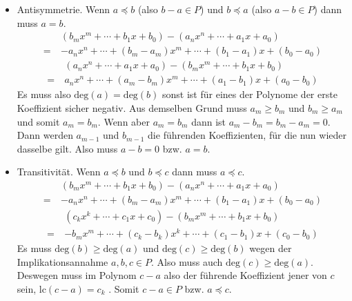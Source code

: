 \documentclass{article}
\begin{document}
\begin{enumerate}
\begin{itemize}
        \item Antisymmetrie. Wenn $a \preccurlyeq b$ (also $b - a \in P$) und $b \preccurlyeq a$ (also $a - b \in P$) dann muss $a = b$.
        \begin{align*}
            &(b_mx^m + \cdots + b_1x + b_0) - (a_nx^n + \cdots + a_1x + a_0) \\
            =\ &-a_nx^n + \cdots + (b_m - a_m)x^m + \cdots + (b_1 - a_1)x + (b_0 - a_0) 
        \end{align*}
        \begin{align*}
            &(a_nx^n + \cdots + a_1x + a_0) - (b_mx^m + \cdots + b_1x + b_0) \\
            =\ &a_nx^n + \cdots + (a_m - b_m)x^m + \cdots + (a_1 - b_1)x + (a_0 - b_0) 
        \end{align*}
        Es muss also $\text{deg}(a) = \text{deg}(b)$ sonst ist für eines der Polynome der erste Koeffizient sicher negativ. Aus demselben Grund muss $a_m \geq b_m$ und $b_m \geq a_m$ und somit $a_m = b_m$. Wenn aber $a_m = b_m$ dann ist $a_m - b_m = b_m - a_m = 0$. Dann werden $a_{m - 1}$ und $b_{m - 1}$ die führenden Koeffizienten, für die nun wieder dasselbe gilt. Also muss $a - b = 0$ bzw. $a = b$.
        
        \item Transitivität. Wenn $a \preccurlyeq b$ und $b \preccurlyeq c$ dann muss $a \preccurlyeq c$.
        \begin{align*}
            &(b_mx^m + \cdots + b_1x + b_0) - (a_nx^n + \cdots + a_1x + a_0) \\
            =\ &-a_nx^n + \cdots + (b_m - a_m)x^m + \cdots + (b_1 - a_1)x + (b_0 - a_0) 
        \end{align*}
        \begin{align*}
            &(c_kx^k + \cdots + c_1x + c_0) - (b_mx^m + \cdots + b_1x + b_0) \\
            =\ &-b_mx^m + \cdots + (c_k - b_k)x^k + \cdots + (c_1 - b_1)x + (c_0 - b_0) 
        \end{align*}
        Es muss $\text{deg}(b) \geq \text{deg}(a)$ und $\text{deg}(c) \geq \text{deg}(b)$ wegen der Implikationsannahme $a, b, c \in P$. Also muss auch $\text{deg}(c) \geq \text{deg}(a)$. Deswegen muss im Polynom $c - a$ also der führende Koeffizient jener von $c$ sein, $\text{lc}(c - a) = c_k$ . Somit $c - a \in P$ bzw. $a \preccurlyeq c$.
        


\end{itemize}
\end{enumerate}
\end{document}
